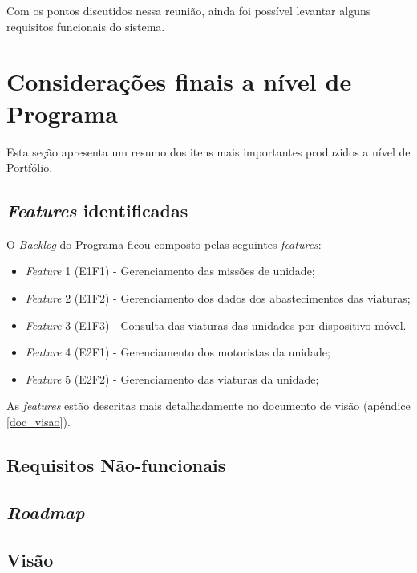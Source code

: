       Com os pontos discutidos nessa reunião, ainda foi possível levantar alguns requisitos funcionais do sistema.
  
  \section{Considerações finais a nível de Programa}
    
    Esta seção apresenta um resumo dos itens mais importantes produzidos a nível de Portfólio.
    
    \subsection{\textit{Features} identificadas}
      
      O \textit{Backlog} do Programa ficou composto pelas seguintes \textit{features}:
      
      \begin{itemize}
       \item \textit{Feature} 1 (E1F1) - Gerenciamento das missões de unidade;
       \item \textit{Feature} 2 (E1F2) - Gerenciamento dos dados dos abastecimentos das viaturas;
       \item \textit{Feature} 3 (E1F3) - Consulta das viaturas das unidades por dispositivo móvel. 
       \item \textit{Feature} 4 (E2F1) - Gerenciamento dos motoristas da unidade;
       \item \textit{Feature} 5 (E2F2) - Gerenciamento das viaturas da unidade;
      \end{itemize}
      
      As \textit{features} estão descritas mais detalhadamente no documento de visão (apêndice \ref{doc_visao}).
    
    \subsection{Requisitos Não-funcionais}
      
      
      
    \subsection{\textit{Roadmap}}
      
      
    \subsection{Visão}
    
      